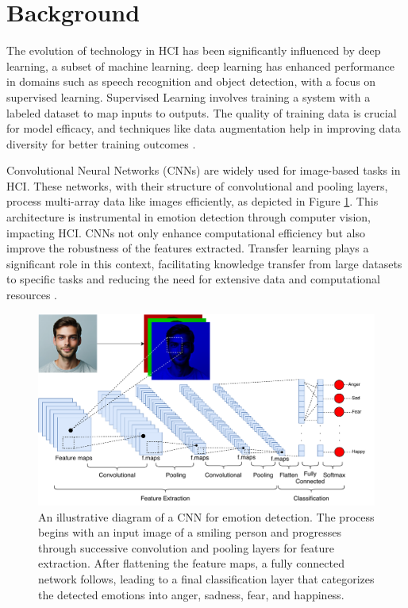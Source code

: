 \documentclass[runningheads]{llncs}
\begin{document}
\section{Background}
\label{sec:background}

The evolution of technology in HCI has been significantly influenced by deep learning, a subset of machine learning. deep learning has enhanced performance in domains such as speech recognition and object detection, with a focus on supervised learning. Supervised Learning involves training a system with a labeled dataset to map inputs to outputs. The quality of training data is crucial for model efficacy, and techniques like data augmentation help in improving data diversity for better training outcomes \cite{Alrowais2023, Martinez2017, Lecun2015, Mahony2020, Shorten2019, Khalifa2022}.

Convolutional Neural Networks (CNNs) are widely used for image-based tasks in HCI. These networks, with their structure of convolutional and pooling layers, process multi-array data like images efficiently, as depicted in Figure \ref{fig:cnnarchitecture}. This architecture is instrumental in emotion detection through computer vision, impacting HCI. CNNs not only enhance computational efficiency but also improve the robustness of the features extracted. Transfer learning plays a significant role in this context, facilitating knowledge transfer from large datasets to specific tasks and reducing the need for extensive data and computational resources \cite{Lecun2015, Khan2020}.

\begin{figure}[htb]
\centering
\includegraphics[width=0.97\linewidth]{CNNArchitecture.pdf}
\caption{An illustrative diagram of a CNN for emotion detection. The process begins with an input image of a smiling person and progresses through successive convolution and pooling layers for feature extraction. After flattening the feature maps, a fully connected network follows, leading to a final classification layer that categorizes the detected emotions into anger, sadness, fear, and happiness.}
\label{fig:cnnarchitecture}
\end{figure}
\end{document}

